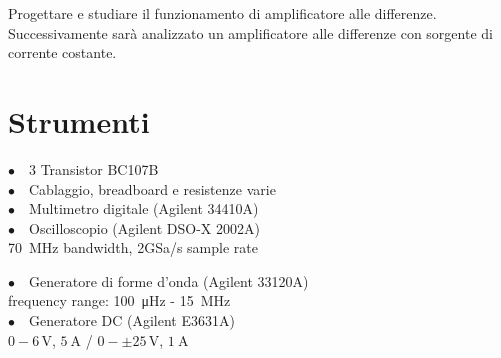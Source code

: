 Progettare e studiare il funzionamento di amplificatore alle differenze. Successivamente sarà analizzato un amplificatore alle differenze con sorgente di corrente costante. 

\section{Strumenti}
%
\noindent
\begin{minipage}{.5\linewidth}
$\bullet \quad$3 Transistor BC107B\\
$\bullet \quad$Cablaggio, breadboard e resistenze varie\\
$\bullet \quad$Multimetro digitale (Agilent 34410A)\\
$\bullet \quad$Oscilloscopio (Agilent DSO-X 2002A)\\
\phantom{xxxx}\SI{70}{\mega\hertz} bandwidth, 2GSa/s sample rate\\
\end{minipage}%
\begin{minipage}{.5\linewidth}
$\bullet \quad$Generatore di forme d'onda (Agilent 33120A)\\
\phantom{xxxx}frequency range: \SI{100}{\micro\hertz} - \SI{15}{\mega\hertz}\\
$\bullet \quad$Generatore DC (Agilent E3631A)\\
\phantom{xxxx}$0-6\,\si{\volt}$, $\SI{5}{\ampere}$ / $0-\pm25\,\si{\volt}$, $\SI{1}{\ampere}$\\
\end{minipage}